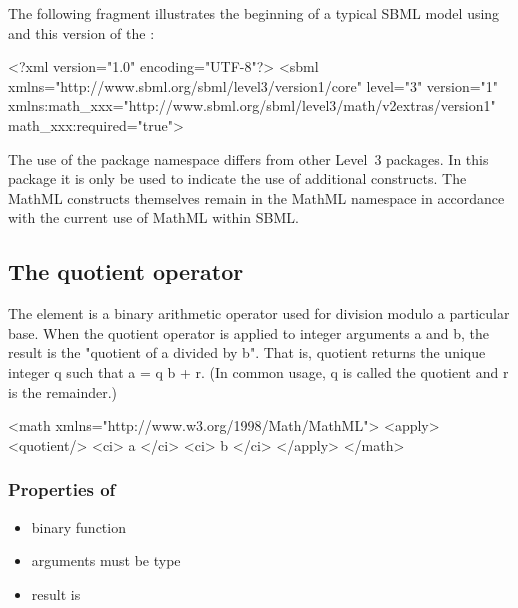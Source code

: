 The following fragment illustrates the beginning of a typical SBML model using \sbmlthreecore and this version of the \ThisPackage:


\begin{example}
<?xml version="1.0" encoding="UTF-8"?>
<sbml xmlns="http://www.sbml.org/sbml/level3/version1/core" level="3" version="1"
      xmlns:math_xxx="http://www.sbml.org/sbml/level3/math/v2extras/version1"
      math_xxx:required="true">
\end{example}

The use of the package namespace differs from other Level~3 packages. In this package it is only be used to indicate the use of additional constructs. The MathML constructs themselves remain in the MathML namespace in accordance with the current use of MathML within SBML. 


\subsection{The quotient operator}
\label{sec_quotient}

The  element is a binary arithmetic operator used for division modulo a particular base. When the quotient operator is applied to integer arguments a and b, the result is the "quotient of a divided by b". That is, quotient returns the unique integer q such that a = q b + r. (In common usage, q is called the quotient and r is the remainder.)

\begin{example}
<math xmlns="http://www.w3.org/1998/Math/MathML">
    <apply>
        <quotient/>
        <ci> a </ci>
        <ci> b </ci>
    </apply>
</math>
\end{example}

\subsubsection{Properties of }

\begin{itemize}\setlength{\parskip}{-0.3ex}

\item binary function

\item arguments must be type 

\item result is 

\end{itemize}


